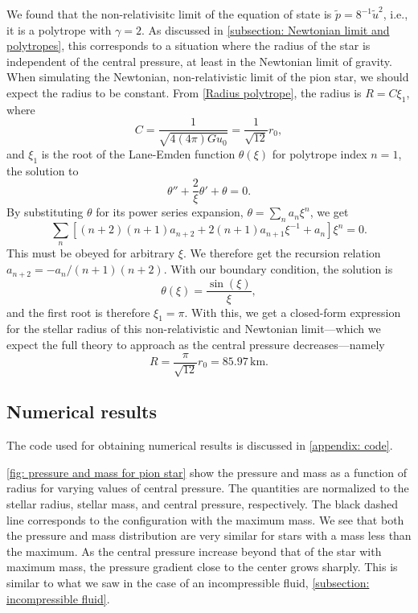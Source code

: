 We found that the non-relativisitc limit of the equation of state is $\tilde p =8^{-1} \tilde u^2$, i.e., it is a polytrope with $\gamma = 2$.
As discussed in \autoref{subsection: Newtonian limit and polytropes}, this corresponds to a situation where the radius of the star is independent of the central pressure, at least in the Newtonian limit of gravity.
When simulating the Newtonian, non-relativistic limit of the pion star, we should expect the radius to be constant.
From \autoref{Radius polytrope}, the radius is $R = C \xi_1$, where
%
\begin{equation}
    C = \frac{1}{\sqrt{4(4\pi ) G u_0}} = \frac{1}{\sqrt{12}}r_0,
\end{equation}
%
and $\xi_1$ is the root of the Lane-Emden function $\theta(\xi)$ for polytrope index $n=1$, the solution to
%
\begin{equation}
    \theta'' + \frac{2}{\xi} \theta' + \theta = 0.
\end{equation}
%
By substituting $\theta$ for its power series expansion, $\theta = \sum_n a_n \xi^n$, we get
%
\begin{equation}
    \sum_n \left[ (n+2)(n+1) a_{n+2} + 2(n+1) a_{n+1} \xi^{-1} + a_n \right] \xi^n = 0.
\end{equation}
%
This must be obeyed for arbitrary $\xi$.
We therefore get the recursion relation $a_{n+2} = - a_n / (n+1)(n+2)$.
With our boundary condition, the solution is
%
\begin{equation}
    \theta(\xi) = \frac{\sin(\xi)}{\xi},
\end{equation}
%
and the first root is therefore $\xi_1 = \pi$.
With this, we get a closed-form expression for the stellar radius of this non-relativistic and Newtonian limit---which we expect the full theory to approach as the central pressure decreases---namely
%
\begin{equation}
    \label{radius pion star nr limit}
    R = \frac{\pi}{\sqrt{12}} r_0 = 85.97 \, \text{km}.
\end{equation}


\subsection{Numerical results}

The code used for obtaining numerical results is discussed in \autoref{appendix: code}.

\autoref{fig: pressure and mass for pion star} show the pressure and mass as a function of radius for varying values of central pressure.
The quantities are normalized to the stellar radius, stellar mass, and central pressure, respectively.
The black dashed line corresponds to the configuration with the maximum mass.
We see that both the pressure and mass distribution are very similar for stars with a mass less than the maximum.
As the central pressure increase beyond that of the star with maximum mass, the pressure gradient close to the center grows sharply.
This is similar to what we saw in the case of an incompressible fluid, \autoref{subsection: incompressible fluid}.


